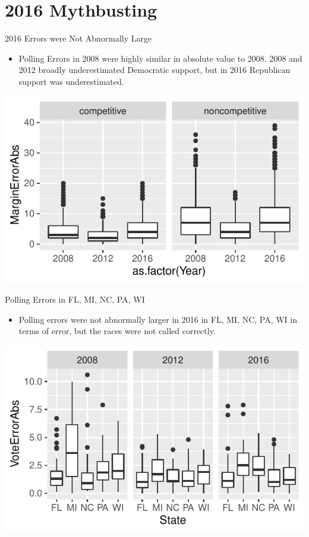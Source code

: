 \documentclass{beamer}\usepackage[]{graphicx}\usepackage[]{color}
\makeatletter
\def\maxwidth{ %
  \ifdim\Gin@nat@width>\linewidth
    \linewidth
  \else
    \Gin@nat@width
  \fi
}
\newenvironment{knitrout}{}{} %
\makeatother
\begin{document}
\section{2016 Mythbusting}
\begin{frame}{2016 Errors were Not Abnormally Large}
\begin{itemize}
\item Polling Errors in 2008 were highly similar in absolute value to 2008. 2008 and 2012 broadly underestimated Democratic support, but in 2016 Republican support was underestimated.
\end{itemize}
\begin{knitrout}
\color{fgcolor}
\includegraphics[width=\maxwidth]{figure/unnamed-chunk-7-1} 

\end{knitrout}
\end{frame}
\begin{frame}{Polling Errors in FL, MI, NC, PA, WI}
\begin{itemize}
\item Polling errors were not abnormally larger in 2016 in FL, MI, NC, PA, WI in terms of error, but the races were not called correctly.  
\end{itemize}
\begin{knitrout}
\color{fgcolor}
\includegraphics[width=\maxwidth]{figure/unnamed-chunk-8-1} 

\end{knitrout}
\end{frame}
\end{document}
